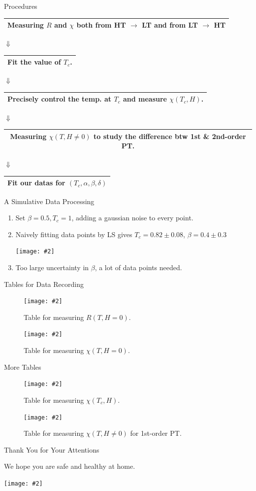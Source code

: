 \documentclass[aspectratio=1610,14pt]{beamer}
\newcommand{\cpic}[2]{
\begin{center}
\texttt{[image: \#2]}
\end{center}
}
\newcommand{\cpicn}[3]
{
\begin{figure}[h!]
\cpic{#1}{#2}
\caption{#3\label{#2}}
\end{figure}
}
\begin{document}
\begin{frame}{Procedures}
\begin{center}
\begin{tabular}{|c|}

\hline
Measuring $R$ and $\chi$ both from HT $\to$ LT and from LT $\to$ HT \\ \hline
\end{tabular}

$\Downarrow$

\begin{tabular}{|c|}
\hline
Fit the value of $T_c$.\\ \hline
\end{tabular}

$\Downarrow$

\begin{tabular}{|c|}
\hline
Precisely control the temp. at $T_c$ and measure $\chi(T_c,H)$.\\ \hline
\end{tabular}

$\Downarrow$

\begin{tabular}{|c|}
\hline
Measuring $\chi(T,H\not= 0)$ to study the difference btw 1st \& 2nd-order PT.\\ \hline
\end{tabular}

$\Downarrow$

\begin{tabular}{|c|}
\hline
Fit our datas for $(T_c,\alpha,\beta,\delta)$  \\ \hline
\end{tabular}
\end{center}
\end{frame}

\begin{frame}{A Simulative Data Processing}
\begin{enumerate}
\item
Set $\beta = 0.5, T_c = 1$, adding a gaussian noise to every point.
\item
Naively fitting data points by LS gives $ T_c =0.82 \pm 0.08$, $\beta = 0.4 \pm 0.3$
\cpic{0.5}{fit}
\item Too large uncertainty in $\beta$, a lot of data points needed.

\end{enumerate}

\end{frame}

\begin{frame}{Tables for Data Recording}
\cpicn{0.5}{rdata}{Table for measuring $R(T,H=0)$.}
\cpicn{0.5}{chit}{Table for measuring $\chi(T,H=0)$.}
\end{frame}
\begin{frame}{More Tables}
\cpicn{0.5}{chib}{Table for measuring $\chi(T_c,H)$.}
\cpicn{0.5}{chi1}{Table for measuring $\chi(T,H\not=0)$ for 1st-order PT.}
\end{frame}


\begin{frame}{Thank You for Your Attentions}
\begin{center}
{\LARGE
We hope you are safe and healthy at home.}
\cpic{0.2}{health}
\end{center}
\end{frame}
\end{document}
